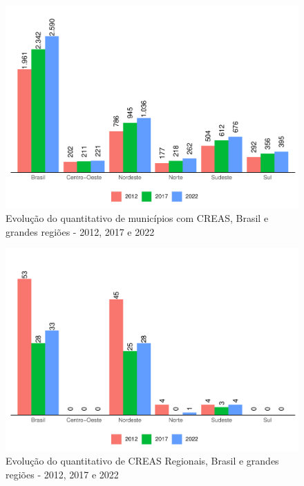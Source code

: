 \documentclass[
  brazilian]{report}
\begin{document}
\begin{figure}
\includegraphics{Censo-SUAS-2022_files/figure-latex/CREAS-quantidade-municipios-1} \caption[Evolução do quantitativo de municípios com CREAS, Brasil e grandes regiões - 2012, 2017 e 2022]{Evolução do quantitativo de municípios com CREAS, Brasil e grandes regiões - 2012, 2017 e 2022}\label{fig:CREAS-quantidade-municipios}
\end{figure}

\begin{figure}
\includegraphics{Censo-SUAS-2022_files/figure-latex/creas-regionais-1} \caption[Evolução do quantitativo de CREAS Regionais, Brasil e grandes regiões - 2012, 2017 e 2022]{Evolução do quantitativo de CREAS Regionais, Brasil e grandes regiões - 2012, 2017 e 2022}\label{fig:creas-regionais}
\end{figure}
\end{document}

